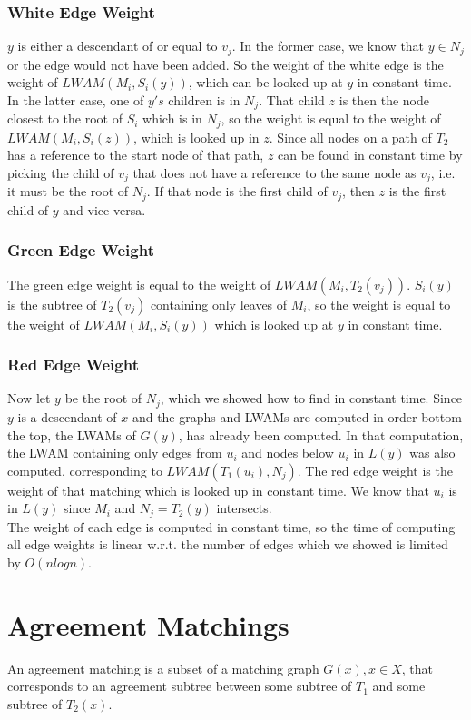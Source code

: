 \subsubsection{White Edge Weight}
$y$ is either a descendant of or equal to $v_j$. In the former case, we know that $y \in N_j$ or the edge would not have been added. So the weight of the white edge is the weight of $LWAM(M_i, S_i(y))$, which can be looked up at $y$ in constant time. In the latter case, one of $y's$ children is in $N_j$. That child $z$ is then the node closest to the root of $S_i$ which is in $N_j$, so the weight is equal to the weight of $LWAM(M_i, S_i(z))$, which is looked up in $z$. Since all nodes on a path of $T_2$ has a reference to the start node of that path, $z$ can be found in constant time by picking the child of $v_j$ that does not have a reference to the same node as $v_j$, i.e. it must be the root of $N_j$. If that node is the first child of $v_j$, then $z$ is the first child of $y$ and vice versa.

\subsubsection{Green Edge Weight}
The green edge weight is equal to the weight of $LWAM(M_i,T_2(v_j))$. $S_i(y)$ is the subtree of $T_2(v_j)$ containing only leaves of $M_i$, so the weight is equal to the weight of $LWAM(M_i, S_i(y))$ which is looked up at $y$ in constant time.

\subsubsection{Red Edge Weight}
Now let $y$ be the root of $N_j$, which we showed how to find in constant time. Since $y$ is a descendant of $x$ and the graphs and LWAMs are computed in order bottom the top, the LWAMs of $G(y)$, has already been computed. In that computation, the LWAM containing only edges from $u_i$ and nodes below $u_i$ in $L(y)$ was also computed, corresponding to $LWAM(T_1(u_i), N_j)$. The red edge weight is the weight of that matching which is looked up in constant time. We know that $u_i$ is in $L(y)$ since $M_i$ and $N_j = T_2(y)$ intersects.\\


The weight of each edge is computed in constant time, so the time of computing all edge weights is linear w.r.t. the number of edges which we showed is limited by $O(nlogn)$.

\section{Agreement Matchings}
\label{agreementMatchingSection}
An agreement matching is a subset of a matching graph $G(x), x \in X$, that corresponds to an agreement subtree between some subtree of $T_1$ and some subtree of $T_2(x)$.


